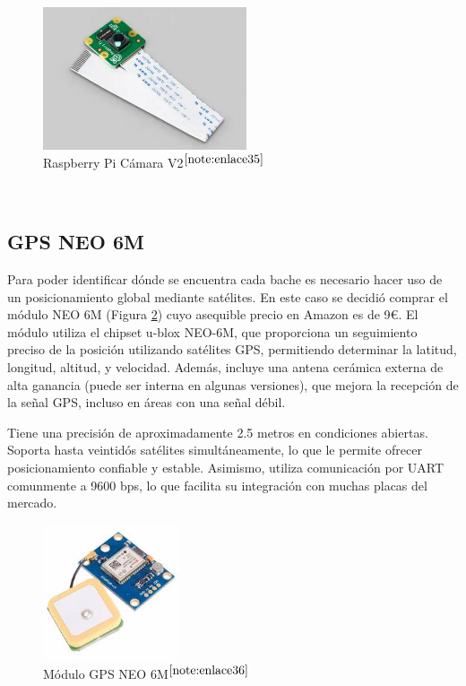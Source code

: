 \begin{figure} [h!]
	\begin{center}
		\includegraphics[width=6cm]{figs/campi.png}
	\end{center}
	\caption{Raspberry Pi Cámara V2$^{\ref{note:enlace35}}$} 
\label{fig:raspberrycam}
\end{figure}\

\setcounter{footnote}{35} %

\subsection{GPS NEO 6M}

Para poder identificar dónde se encuentra cada bache es necesario hacer uso de un posicionamiento global mediante satélites. En este caso se decidió comprar el módulo NEO 6M (Figura \ref{fig:gps}) cuyo asequible precio en Amazon es de 9€. El módulo utiliza el chipset u-blox NEO-6M, que proporciona un seguimiento preciso de la posición utilizando satélites \acs{GPS}, permitiendo determinar la latitud, longitud, altitud, y velocidad. Además, incluye una antena cerámica externa de alta ganancia (puede ser interna en algunas versiones), que mejora la recepción de la señal \acs{GPS}, incluso en áreas con una señal débil.

Tiene una precisión de aproximadamente 2.5 metros en condiciones abiertas. Soporta hasta veintidós satélites simultáneamente, lo que le permite ofrecer posicionamiento confiable y estable. Asimismo, utiliza comunicación por \ac{UART} comunmente a 9600 bps, lo que facilita su integración con muchas placas del mercado.

\begin{figure} [h!]
	\begin{center}
		\includegraphics[width=4cm]{figs/GPSNEO6MV2.jpeg}
	\end{center}
	\caption{Módulo GPS NEO 6M$^{\ref{note:enlace36}}$} 
\label{fig:gps}
\end{figure}\

